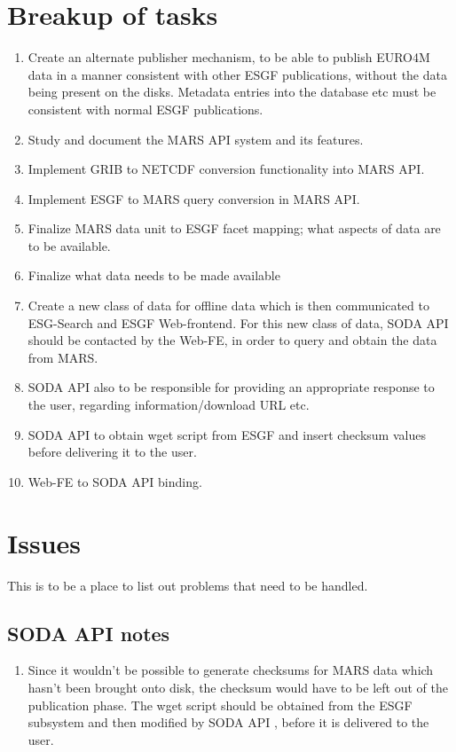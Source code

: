 \documentclass[oneside,12pt]{memoir}
\def\phname{SODA API{ }}
\begin{document}
\section{Breakup of tasks}
\begin{enumerate}
\item Create an alternate publisher mechanism, to be able to publish EURO4M data in a manner consistent with other ESGF publications, without the data being present on the disks. Metadata entries into the database etc must be consistent with normal ESGF publications.
\item Study and document the MARS API system and its features.
\item Implement GRIB to NETCDF conversion functionality into MARS API.
\item Implement ESGF to MARS query conversion in MARS API.
\item Finalize MARS data unit to ESGF facet mapping; what aspects of data are to be available.
\item Finalize what data needs to be made available
\item Create a new class of data for offline data which is then communicated to ESG-Search and ESGF Web-frontend. For this new class of data, \phname should be contacted by the Web-FE, in order to query and obtain the data from MARS. 
\item \phname also to be responsible for providing an appropriate response to the user, regarding information/download URL etc.
\item \phname to obtain wget script from ESGF and insert checksum values before delivering it to the user.
\item Web-FE to \phname binding.
\end{enumerate}
\section{Issues}
This is to be a place to list out problems that need to be handled.
\subsection{\phname notes}
\begin{enumerate}
\item Since it wouldn't be possible to generate checksums for MARS data which hasn't been brought onto disk, the checksum would have to be left out of the publication phase. The wget script should be obtained from the ESGF subsystem and then modified by \phname, before it is delivered to the user.
\end{enumerate}
\end{document}
